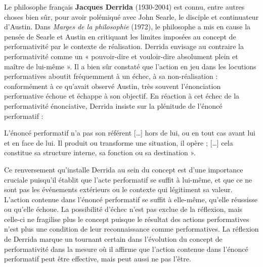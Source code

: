 Le philosophe français \textbf{Jacques Derrida} (1930-2004) est connu, entre autres choses bien sûr, pour avoir polémiqué avec John Searle, le disciple et continuateur d’Austin. Dans \textit{Marges de la philosophie} (1972), le philosophe a mis en cause la pensée de Searle et Austin en critiquant les limites imposées au concept de performativité par le contexte de réalisation. Derrida envisage au contraire la performativité comme un « pouvoir-dire et vouloir-dire absolument plein et maître de lui-même ». Il a bien sûr constaté que l’action en jeu dans les locutions performatives aboutit fréquemment à un échec, à sa non-réalisation : conformément à ce qu’avait observé Austin, très souvent l’énonciation performative échoue et échappe à son objectif. En réaction à cet échec de la performativité énonciative, Derrida insiste sur la plénitude de l’énoncé performatif :

\begin{lecture}{}
L’énoncé performatif n’a pas son référent […] hors de lui, ou en tout cas avant lui et en face de lui. Il produit ou transforme une situation, il opère ; […] cela constitue sa structure interne, sa fonction ou sa destination ».
\end{lecture}

Ce renversement qu’installe Derrida au sein du concept est d’une importance cruciale puisqu’il établit que l’acte performatif se suffit à lui-même, et que ce ne sont pas les événements extérieurs ou le contexte qui légitiment sa valeur. L’action contenue dans l’énoncé performatif se suffit à elle-même, qu’elle réussisse ou qu’elle échoue. La possibilité d’échec n’est pas exclue de la réflexion, mais celle-ci ne fragilise plus le concept puisque le résultat des actions performatives n’est plus une condition de leur reconnaissance comme performatives. La réflexion de Derrida marque un tournant certain dans l’évolution du concept de performativité dans la mesure où il affirme que l’action contenue dans l’énoncé performatif peut être effective, mais peut aussi ne pas l’être.

